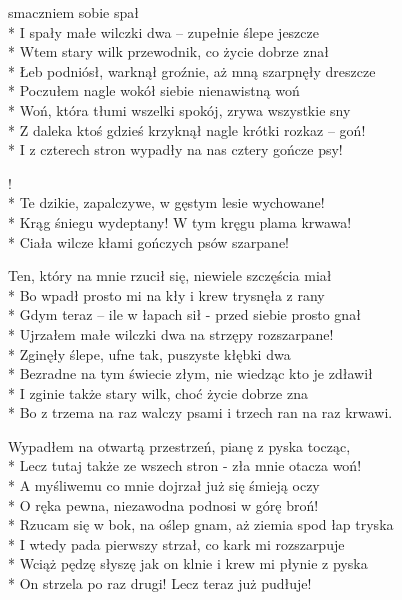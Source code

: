 \begin{lyrics}[longestline={Bo z trzema na raz walczy psami i trzech ran na raz krwawi.}]

 smaczniem sobie spał\\*
I spały małe wilczki dwa -- zupełnie ślepe jeszcze\\*
Wtem stary wilk przewodnik, co życie dobrze znał\\*
Łeb podniósł, warknął groźnie, aż mną szarpnęły dreszcze\\*
Poczułem nagle wokół siebie nienawistną woń\\*
Woń, która tłumi wszelki spokój, zrywa wszystkie sny\\*
Z daleka ktoś gdzieś krzyknął nagle krótki rozkaz -- goń!\\*
I z czterech stron wypadły na nas cztery gończe psy!

\begin{chorus}
!\\*
Te dzikie, zapalczywe, w gęstym lesie wychowane!\\*
Krąg śniegu wydeptany! W tym kręgu plama krwawa!\\*
Ciała wilcze kłami gończych psów szarpane!
\end{chorus}

Ten, który na mnie rzucił się, niewiele szczęścia miał\\*
Bo wpadł prosto mi na kły i krew trysnęła z rany\\*
Gdym teraz -- ile w łapach sił - przed siebie prosto gnał\\*
Ujrzałem małe wilczki dwa na strzępy rozszarpane!\\*
Zginęły ślepe, ufne tak, puszyste kłębki dwa\\*
Bezradne na tym świecie złym, nie wiedząc kto je zdławił\\*
I zginie także stary wilk, choć życie dobrze zna\\*
Bo z trzema na raz walczy psami i trzech ran na raz krwawi.

\chorusref

\breaklyrics

Wypadłem na otwartą przestrzeń, pianę z pyska tocząc,\\*
Lecz tutaj także ze wszech stron - zła mnie otacza woń!\\*
A myśliwemu co mnie dojrzał już się śmieją oczy\\*
O ręka pewna, niezawodna podnosi w górę broń!\\*
Rzucam się w bok, na oślep gnam, aż ziemia spod łap tryska\\*
I wtedy pada pierwszy strzał, co kark mi rozszarpuje\\*
Wciąż pędzę słyszę jak on klnie i krew mi płynie z pyska\\*
On strzela po raz drugi! Lecz teraz już pudłuje!


\end{lyrics}
